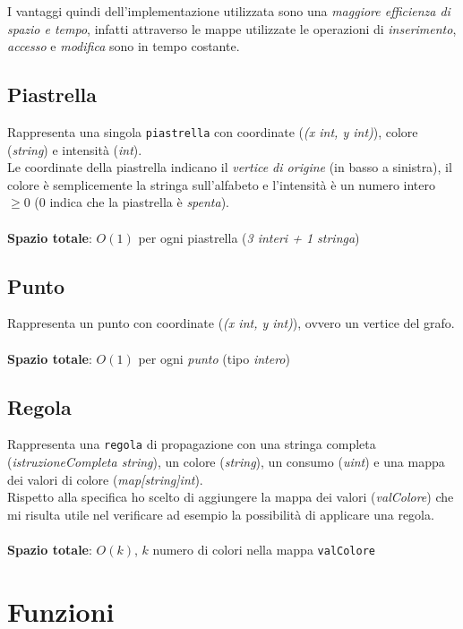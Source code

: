 \documentclass{article}
\begin{document}
I vantaggi quindi dell'implementazione utilizzata sono una \textit{maggiore efficienza di spazio e tempo}, infatti attraverso le mappe utilizzate le operazioni di \textit{inserimento}, \textit{accesso} e \textit{modifica} sono in tempo costante.

\subsection*{Piastrella}
Rappresenta una singola \texttt{piastrella} con coordinate (\textit{(x int, y int)}), colore (\textit{string}) e intensità (\textit{int}).\\
Le coordinate della piastrella indicano il \textit{vertice di origine} (in basso a sinistra), il colore è semplicemente la stringa sull'alfabeto e l'intensità è un numero intero \(\geq 0\) (\(0\) indica che la piastrella è \textit{spenta}).
\\ \\
\textbf{Spazio totale}: \(O(1)\) per ogni piastrella (\textit{3 interi + 1 stringa})

\subsection*{Punto}
Rappresenta un punto con coordinate (\textit{(x int, y int)}), ovvero un vertice del grafo.\\ \\
\textbf{Spazio totale}: \(O(1)\) per ogni \textit{punto} (tipo \textit{intero})

\subsection*{Regola}\label{subsec:rule}
Rappresenta una \texttt{regola} di propagazione con una stringa completa (\textit{istruzioneCompleta string}), un colore (\textit{string}), un consumo (\textit{uint}) e una mappa dei valori di colore (\textit{map[string]int}).\\
Rispetto alla specifica ho scelto di aggiungere la mappa dei valori (\textit{valColore}) che mi risulta utile nel verificare ad esempio la possibilità di applicare una regola.\\ \\
\textbf{Spazio totale}: \(O(k)\), \(k\) numero di colori nella mappa \texttt{valColore}

\section{Funzioni}\label{sec:funcs}
\end{document}
